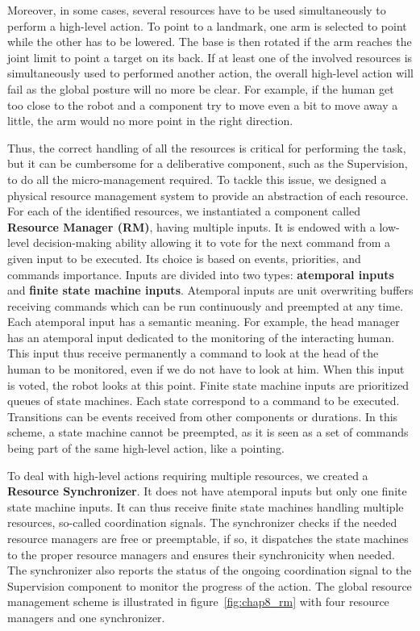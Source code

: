 Moreover, in some cases, several resources have to be used simultaneously to perform a high-level action. To point to a landmark, one arm is selected to point while the other has to be lowered. The base is then rotated if the arm reaches the joint limit to point a target on its back. If at least one of the involved resources is simultaneously used to performed another action, the overall high-level action will fail as the global posture will no more be clear. For example, if the human get too close to the robot and a component try to move even a bit to move away a little, the arm would no more point in the right direction.

Thus, the correct handling of all the resources is critical for performing the task, but it can be cumbersome for a deliberative component, such as the Supervision, to do all the micro-management required. To tackle this issue, we designed a physical resource management system to provide an abstraction of each resource. For each of the identified resources, we instantiated a component called \textbf{Resource Manager (RM)}, having multiple inputs. It is endowed with a low-level decision-making ability allowing it to vote for the next command from a given input to be executed. Its choice is based on events, priorities, and commands importance. Inputs are divided into two types: \textbf{atemporal inputs} and \textbf{finite state machine inputs}. Atemporal inputs are unit overwriting buffers receiving commands which can be run continuously and preempted at any time. Each atemporal input has a semantic meaning. For example, the head manager has an atemporal input dedicated to the monitoring of the interacting human. This input thus receive permanently a command to look at the head of the human to be monitored, even if we do not have to look at him. When this input is voted, the robot looks at this point. Finite state machine inputs are prioritized queues of state machines. Each state correspond to a command to be executed. Transitions can be events received from other components or durations. In this scheme, a state machine cannot be preempted, as it is seen as a set of commands being part of the same high-level action, like a pointing.

To deal with high-level actions requiring multiple resources, we created a \textbf{Resource Synchronizer}. It does not have atemporal inputs but only one finite state machine inputs. It can thus receive finite state machines handling multiple resources, so-called coordination signals. The synchronizer checks if the needed resource managers are free or preemptable, if so, it dispatches the state machines to the proper resource managers and ensures their synchronicity when needed. The synchronizer also reports the status of the ongoing coordination signal to the Supervision component to monitor the progress of the action.
The global resource management scheme is illustrated in figure~\ref{fig:chap8_rm} with four resource managers and one synchronizer.

